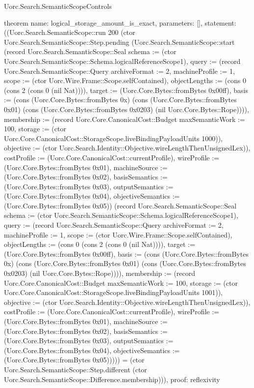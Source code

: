 \begin{lexlean}{Uorc.Search.SemanticScopeControls}
\begin{semanticmodule}
theorem{
  name: logical_storage_amount_is_exact,
  parameters: [],
  statement: ((Uorc.Search.SemanticScope::run 200 (ctor Uorc.Search.SemanticScope::Step.pending (Uorc.Search.SemanticScope::start (record Uorc.Search.SemanticScope::Seal {schema := (ctor Uorc.Search.SemanticScope::Schema.logicalReferenceScope1), query := (record Uorc.Search.SemanticScope::Query {archiveFormat := 2, machineProfile := 1, scope := (ctor Uorc.Wire.Frame::Scope.selfContained), objectLengths := (cons 0 (cons 2 (cons 0 (nil Nat)))), target := (Uorc.Core.Bytes::fromBytes 0x00ff), basis := (cons (Uorc.Core.Bytes::fromBytes 0x) (cons (Uorc.Core.Bytes::fromBytes 0x01) (cons (Uorc.Core.Bytes::fromBytes 0x0203) (nil Uorc.Core.Bytes::Rope)))), membership := (record Uorc.Core.CanonicalCost::Budget {maxSemanticWork := 100, storage := (ctor Uorc.Core.CanonicalCost::StorageScope.liveBindingPayloadUnits 1000)}), objective := (ctor Uorc.Search.Identity::Objective.wireLengthThenUnsignedLex)}), costProfile := (Uorc.Core.CanonicalCost::currentProfile), wireProfile := (Uorc.Core.Bytes::fromBytes 0x01), machineSource := (Uorc.Core.Bytes::fromBytes 0x02), basisSemantics := (Uorc.Core.Bytes::fromBytes 0x03), outputSemantics := (Uorc.Core.Bytes::fromBytes 0x04), objectiveSemantics := (Uorc.Core.Bytes::fromBytes 0x05)}) (record Uorc.Search.SemanticScope::Seal {schema := (ctor Uorc.Search.SemanticScope::Schema.logicalReferenceScope1), query := (record Uorc.Search.SemanticScope::Query {archiveFormat := 2, machineProfile := 1, scope := (ctor Uorc.Wire.Frame::Scope.selfContained), objectLengths := (cons 0 (cons 2 (cons 0 (nil Nat)))), target := (Uorc.Core.Bytes::fromBytes 0x00ff), basis := (cons (Uorc.Core.Bytes::fromBytes 0x) (cons (Uorc.Core.Bytes::fromBytes 0x01) (cons (Uorc.Core.Bytes::fromBytes 0x0203) (nil Uorc.Core.Bytes::Rope)))), membership := (record Uorc.Core.CanonicalCost::Budget {maxSemanticWork := 100, storage := (ctor Uorc.Core.CanonicalCost::StorageScope.liveBindingPayloadUnits 1001)}), objective := (ctor Uorc.Search.Identity::Objective.wireLengthThenUnsignedLex)}), costProfile := (Uorc.Core.CanonicalCost::currentProfile), wireProfile := (Uorc.Core.Bytes::fromBytes 0x01), machineSource := (Uorc.Core.Bytes::fromBytes 0x02), basisSemantics := (Uorc.Core.Bytes::fromBytes 0x03), outputSemantics := (Uorc.Core.Bytes::fromBytes 0x04), objectiveSemantics := (Uorc.Core.Bytes::fromBytes 0x05)})))) = (ctor Uorc.Search.SemanticScope::Step.different (ctor Uorc.Search.SemanticScope::Difference.membership))),
  proof: reflexivity{}
}


\end{semanticmodule}
\end{lexlean}
